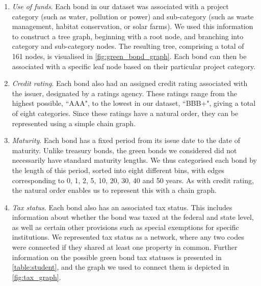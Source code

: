 \begin{enumerate}
    \item \textit{Use of funds}. Each bond in our dataset was associated with a project category (such as water, pollution or power) and sub-category (such as waste management, habitat conservation, or solar farms). We used this information to construct a tree graph, beginning with a root node, and branching into category and sub-category nodes. The resulting tree, comprising a total of 161 nodes, is visualised in \cref{fig:green_bond_graph}. Each bond can then be associated with a specific leaf node based on their particular project category.
    \item \textit{Credit rating}. Each bond also had an assigned credit rating associated with the issuer, designated by a ratings agency. These ratings range from the highest possible, ``AAA", to the lowest in our dataset, ``BBB+", giving a total of eight categories. Since these ratings have a natural order, they can be represented using a simple chain graph.
    \item \textit{Maturity}. Each bond has a fixed period from its issue date to the date of maturity. Unlike treasury bonds, the green bonds we considered did not necessarily have standard maturity lengths. We thus categorised each bond by the length of this period, sorted into eight different bins, with edges corresponding to 0, 1, 2, 5, 10, 20, 30, 40 and 50 years. As with credit rating, the natural order enables us to represent this with a chain graph.
    \item \textit{Tax status}. Each bond also has an associated tax status. This includes information about whether the bond was taxed at the federal and state level, as well as certain other provisions such as special exemptions for specific institutions. We represented tax status as a network, where any two codes were connected if they shared at least one property in common. Further information on the possible green bond tax statuses is presented in \cref{table:student}, and the graph we used to connect them is depicted in \cref{fig:tax_graph}.
    \end{enumerate}


